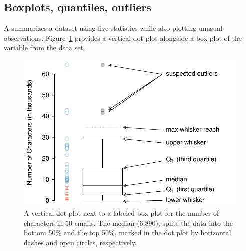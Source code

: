 \begin{doublespace}

\subsection{Boxplots, quantiles, outliers}

A  summarizes a dataset using five statistics while also plotting unusual observations. Figure~\ref{boxPlotLayoutNumVar} provides a vertical dot plot alongside a box plot of the  variable from the  data set.

\begin{figure}[h]
	\centering
	\includegraphics[width=0.86\mycaptionwidth]{ch_intro_to_data_oi_biostat/figures/boxPlotLayoutNumVar/boxPlotLayoutNumVar}
	\caption{A vertical dot plot next to a labeled box plot for the number of characters in 50 emails. The median (6,890), splits the data into the bottom 50\% and the top 50\%, marked in the dot plot by horizontal dashes and open circles, respectively.}
	\label{boxPlotLayoutNumVar}
\end{figure}


\end{doublespace}
